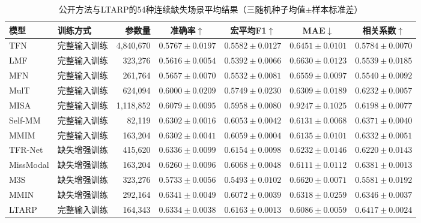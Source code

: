 \begin{table}[H]
\centering\scriptsize\setlength{\tabcolsep}{2.25pt}
\caption{公开方法与LTARP的54种连续缺失场景平均结果（三随机种子均值$\pm$样本标准差）}
\label{tab:q2_public_missing}
\begin{tabular}{llrcccc}
\toprule
模型 & 训练方式 & 参数量 & 准确率$\uparrow$ & 宏平均F1$\uparrow$ & MAE$\downarrow$ & 相关系数$\uparrow$\\
\midrule
TFN & 完整输入训练 & 4,840,670 & $0.5767\pm0.0197$ & $0.5582\pm0.0127$ & $0.6451\pm0.0101$ & $0.5784\pm0.0070$\\
LMF & 完整输入训练 & 323,276 & $0.5616\pm0.0054$ & $0.5392\pm0.0066$ & $0.6630\pm0.0123$ & $0.5539\pm0.0185$\\
MFN & 完整输入训练 & 261,764 & $0.5657\pm0.0070$ & $0.5532\pm0.0081$ & $0.6559\pm0.0097$ & $0.5540\pm0.0092$\\
MulT & 完整输入训练 & 624,094 & $0.6000\pm0.0209$ & $0.5749\pm0.0230$ & $0.6309\pm0.0189$ & $0.6232\pm0.0057$\\
MISA & 完整输入训练 & 1,118,852 & $0.6079\pm0.0095$ & $0.5958\pm0.0080$ & $0.9247\pm0.1025$ & $0.6198\pm0.0077$\\
Self-MM & 完整输入训练 & 82,119 & $0.6302\pm0.0016$ & $0.6053\pm0.0042$ & $0.6131\pm0.0068$ & $0.6371\pm0.0040$\\
MMIM & 完整输入训练 & 163,204 & $0.6302\pm0.0041$ & $0.6059\pm0.0004$ & $0.6135\pm0.0101$ & $0.6332\pm0.0051$\\
\addlinespace\midrule
TFR-Net & 缺失增强训练 & 415,620 & $0.6336\pm0.0099$ & $0.6154\pm0.0098$ & $0.6232\pm0.0146$ & $0.6220\pm0.0143$\\
MissModal & 缺失增强训练 & 163,204 & $0.6260\pm0.0096$ & $0.6068\pm0.0048$ & $0.6111\pm0.0112$ & $0.6381\pm0.0013$\\
M3S & 缺失增强训练 & 323,276 & $0.5733\pm0.0056$ & $0.5493\pm0.0102$ & $0.6620\pm0.0071$ & $0.5581\pm0.0192$\\
MMIN & 缺失增强训练 & 292,164 & $0.6341\pm0.0049$ & $0.6072\pm0.0039$ & $0.6318\pm0.0259$ & $0.6346\pm0.0037$\\
\addlinespace\midrule
LTARP & 完整输入训练 & 164,343 & $0.6334\pm0.0038$ & $0.6163\pm0.0013$ & $0.6086\pm0.0059$ & $0.6417\pm0.0024$\\
\bottomrule
\end{tabular}
\end{table}